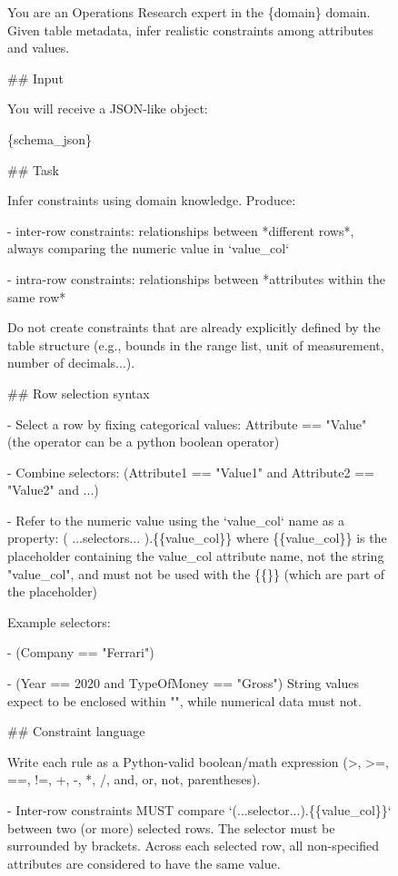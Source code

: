 \begin{figure}[t!]\small
\centering
\begin{tcolorbox}[
  title=Semantic constraint generation prompt,
  fonttitle=\bfseries,
  sharp corners=all,
]

You are an Operations Research expert in the \{domain\} domain. Given table metadata, infer realistic constraints among attributes and values.

\#\# Input

You will receive a JSON-like object:

\{schema\_json\}

\#\# Task

Infer constraints using domain knowledge. Produce:

- inter-row constraints: relationships between *different rows*, always comparing the numeric value in `value\_col`

- intra-row constraints: relationships between *attributes within the same row*

Do not create constraints that are already explicitly defined by the table structure (e.g., bounds in the range list, unit of measurement, number of decimals...).

\#\# Row selection syntax

- Select a row by fixing categorical values:  Attribute == "Value" (the operator can be a python boolean operator)

- Combine selectors: (Attribute1 == "Value1" and Attribute2 == "Value2" and ...)

- Refer to the numeric value using the `value\_col` name as a property:
  ( ...selectors... ).\{\{value\_col\}\} 
  where \{\{value\_col\}\} is the placeholder containing the value\_col attribute name, not the string "value\_col", and must not be used with the \{\{\}\} (which are part of the placeholder)

Example selectors:

- (Company == "Ferrari")

- (Year == 2020 and TypeOfMoney == "Gross")
String values expect to be enclosed within "", while numerical data must not.

\#\# Constraint language

Write each rule as a Python-valid boolean/math expression (>, >=, ==, !=, +, -, *, /, and, or, not, parentheses).

- Inter-row constraints MUST compare `(...selector...).\{\{value\_col\}\}` between two (or more) selected rows. The selector must be surrounded by brackets. Across each selected row, all non-specified attributes are considered to have the same value.


\end{tcolorbox}
\end{figure}
